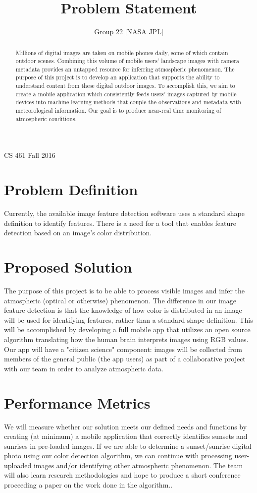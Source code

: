 \documentclass[letterpaper,10pt,draftclsnofoot,onecolumn]{IEEEtran}
\title{Problem Statement}
\author{\name}
\date{Group 22 [NASA JPL]}
\def\course{CS 461 Fall 2016}
\begin{document}
\begin{titlingpage}
\maketitle
\vspace*{10em}
\centering
\course
\vspace*{4em}
\begin{abstract} 
Millions of digital images are taken on mobile phones daily, some of which contain outdoor scenes. Combining this volume of mobile users' landscape images with camera metadata provides an untapped resource for inferring atmospheric phenomenon. The purpose of this project is to develop an application that supports the ability to understand content from these digital outdoor images. To accomplish this, we aim to create a mobile application which consistently feeds users' images captured by mobile devices into machine learning methods that couple the observations and metadata with meteorological information. Our goal is to produce near-real time monitoring of atmospheric conditions.
\end{abstract}
\end{titlingpage}
\clearpage
\section{Problem Definition}
Currently, the available image feature detection software uses a standard shape definition to identify features. There is a need for a tool that enables feature detection based on an image's color distribution.

\section{Proposed Solution}
The purpose of this project is to be able to process visible images and infer the atmospheric (optical or otherwise) phenomenon. The difference in our image feature detection is that the knowledge of how color is distributed in an image will be used for identifying features, rather than a standard shape definition. This will be accomplished by developing a full mobile app that utilizes an open source algorithm translating how the human brain interprets images using RGB values. Our app will have a "citizen science" component: images will be collected from members of the general public (the app users) as part of a collaborative project with our team in order to analyze atmospheric data.

\section{Performance Metrics}
We will measure whether our solution meets our defined needs and functions by creating (at minimum) a mobile application that correctly identifies sunsets and sunrises in pre-loaded images. If we are able to determine a sunset/sunrise digital photo using our color detection algorithm, we can continue with processing user-uploaded images and/or identifying other atmospheric phenomenon. The team will also learn research methodologies and hope to produce a short conference proceeding a paper on the work done in the algorithm..  
\clearpage
\end{document}
